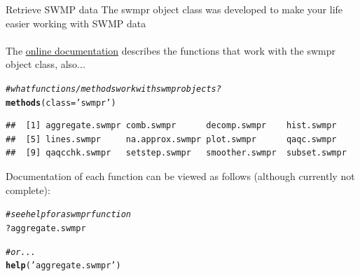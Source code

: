 \documentclass[xcolor=svgnames]{beamer}\usepackage[]{graphicx}\usepackage[]{color}
\makeatletter
\newcommand{\hlstr}[1]{\textcolor[rgb]{0.192,0.494,0.8}{#1}}%
\newcommand{\hlcom}[1]{\textcolor[rgb]{0.678,0.584,0.686}{\textit{#1}}}%
\newcommand{\hlopt}[1]{\textcolor[rgb]{0,0,0}{#1}}%
\newcommand{\hlstd}[1]{\textcolor[rgb]{0.345,0.345,0.345}{#1}}%
\newcommand{\hlkwc}[1]{\textcolor[rgb]{0.333,0.667,0.333}{#1}}%
\newcommand{\hlkwd}[1]{\textcolor[rgb]{0.737,0.353,0.396}{\textbf{#1}}}%
\newenvironment{kframe}{%
 \def\at@end@of@kframe{}%
 \ifinner\ifhmode%
  \def\at@end@of@kframe{\end{minipage}}%
  \begin{minipage}{\columnwidth}%
 \fi\fi%
 \def\FrameCommand##1{\hskip\@totalleftmargin \hskip-\fboxsep
 \colorbox{shadecolor}{##1}\hskip-\fboxsep
     \hskip-\linewidth \hskip-\@totalleftmargin \hskip\columnwidth}%
 \MakeFramed {\advance\hsize-\width
   \@totalleftmargin\z@ \linewidth\hsize
   \@setminipage}}%
 {\par\unskip\endMakeFramed%
 \at@end@of@kframe}
\newenvironment{knitrout}{}{} %
\makeatother
\begin{document}
\begin{frame}{Retrieve SWMP data}
The swmpr object class was developed to make your life easier working with SWMP data\\~\\
The \href{https://github.com/fawda123/SWMPr}{online documentation} describes the functions that work with the swmpr object class, also...
\begin{knitrout}\scriptsize
{}\color{fgcolor}\begin{kframe}
\begin{alltt}
\hlcom{# what functions/methods work with swmpr objects?}
\hlkwd{methods}\hlstd{(}\hlkwc{class} \hlstd{=} \hlstr{'swmpr'}\hlstd{)}
\end{alltt}
\begin{verbatim}
##  [1] aggregate.swmpr comb.swmpr      decomp.swmpr    hist.swmpr     
##  [5] lines.swmpr     na.approx.swmpr plot.swmpr      qaqc.swmpr     
##  [9] qaqcchk.swmpr   setstep.swmpr   smoother.swmpr  subset.swmpr
\end{verbatim}
\end{kframe}
\end{knitrout}
Documentation of each function can be viewed as follows (although currently not complete):
\begin{knitrout}\scriptsize
{}\color{fgcolor}\begin{kframe}
\begin{alltt}
\hlcom{# see help for a swmpr function}
\hlopt{?}\hlstd{aggregate.swmpr}

\hlcom{# or...}
\hlkwd{help}\hlstd{(}\hlstr{'aggregate.swmpr'}\hlstd{)}
\end{alltt}
\end{kframe}
\end{knitrout}
\end{frame}
\end{document}
